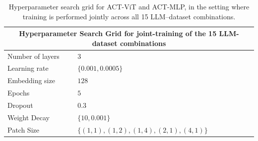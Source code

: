 \begin{table}[t]
\centering
\caption{Hyperparameter search grid for ACT-ViT and ACT-MLP, in the setting where training is
performed jointly across all 15 LLM--dataset combinations.}
\label{tab:hp_joint}
\renewcommand{\arraystretch}{1.15}
\begin{tabular}{|l|l|}
\hline
\multicolumn{2}{|c|}{\textbf{Hyperparameter Search Grid for joint-training of the 15 LLM-dataset combinations}} \\
\hline
Number of layers & $3$ \\
\hline
Learning rate    & $\{0.001, 0.0005\}$ \\
\hline
Embedding size   & $128$ \\
\hline
Epochs           & $5$ \\
\hline
Dropout          & $0.3$ \\
\hline
Weight Decay     & $\{10, 0.001\}$ \\
\hline
Patch Size       & $\{(1, 1), (1, 2), (1, 4), (2, 1), (4, 1)\}$ \\
\hline
\end{tabular}
\end{table}

